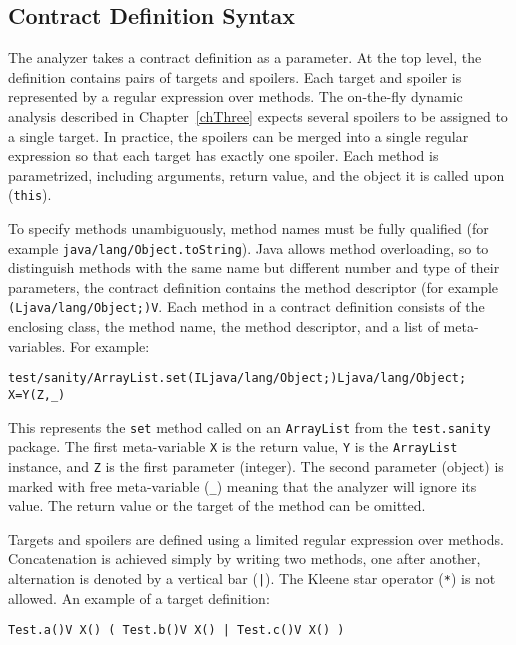 \subsection{Contract Definition Syntax}

The analyzer takes a contract definition as a parameter. At the top level, the
definition contains pairs of targets and spoilers. Each target and spoiler is
represented by a regular expression over methods. The on-the-fly dynamic
analysis described in Chapter~\ref{chThree} expects several spoilers to be
assigned to a single target. In practice, the spoilers can be merged into a
single regular expression so that each target has exactly one spoiler. Each
method is parametrized, including arguments, return value, and the object it is
called upon (\texttt{this}).

To specify methods unambiguously, method names must be fully qualified (for
example \texttt{java/lang/Object.toString}). Java allows method overloading, so
to distinguish methods with the same name but different number and type of their
parameters, the contract definition contains the method descriptor (for example
\texttt{(Ljava/lang/Object;)V}. Each method in a contract definition consists of
the enclosing class, the method name, the method descriptor, and a list of
meta-variables. For example:

\begin{lstlisting}
test/sanity/ArrayList.set(ILjava/lang/Object;)Ljava/lang/Object; X=Y(Z,_)
\end{lstlisting}

This represents the \texttt{set} method called on an \texttt{ArrayList} from
the \texttt{test.sanity} package. The first meta-variable \texttt{X} is the
return value, \texttt{Y} is the \texttt{ArrayList} instance, and \texttt{Z} is
the first parameter (integer). The second parameter (object) is marked with free
meta-variable (\texttt{\_}) meaning that the analyzer will ignore its value. The
return value or the target of the method can be omitted.

Targets and spoilers are defined using a limited regular expression over
methods. Concatenation is achieved simply by writing two methods, one after
another, alternation is denoted by a vertical bar (\texttt{|}). The Kleene star
operator (\texttt{*}) is not allowed. An example of a target definition:

\begin{lstlisting}
Test.a()V X() ( Test.b()V X() | Test.c()V X() )
\end{lstlisting}

